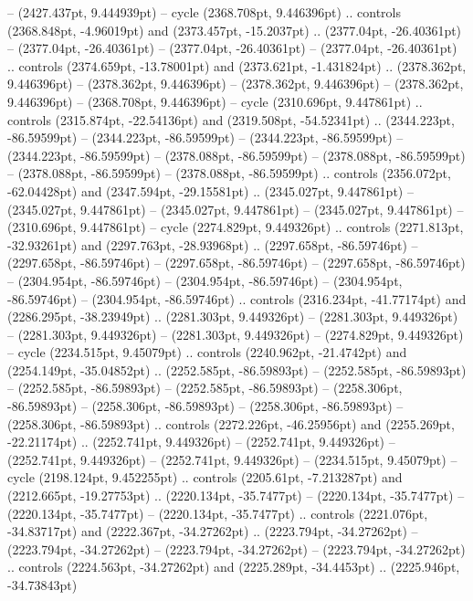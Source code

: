  -- (2427.437pt, 9.444939pt) -- cycle
(2368.708pt, 9.446396pt) .. controls (2368.848pt, -4.96019pt) and (2373.457pt, -15.2037pt) .. (2377.04pt, -26.40361pt)
 -- (2377.04pt, -26.40361pt)
 -- (2377.04pt, -26.40361pt)
 -- (2377.04pt, -26.40361pt) .. controls (2374.659pt, -13.78001pt) and (2373.621pt, -1.431824pt) .. (2378.362pt, 9.446396pt)
 -- (2378.362pt, 9.446396pt)
 -- (2378.362pt, 9.446396pt)
 -- (2378.362pt, 9.446396pt)
 -- (2368.708pt, 9.446396pt) -- cycle
(2310.696pt, 9.447861pt) .. controls (2315.874pt, -22.54136pt) and (2319.508pt, -54.52341pt) .. (2344.223pt, -86.59599pt)
 -- (2344.223pt, -86.59599pt)
 -- (2344.223pt, -86.59599pt)
 -- (2344.223pt, -86.59599pt)
 -- (2378.088pt, -86.59599pt)
 -- (2378.088pt, -86.59599pt)
 -- (2378.088pt, -86.59599pt)
 -- (2378.088pt, -86.59599pt) .. controls (2356.072pt, -62.04428pt) and (2347.594pt, -29.15581pt) .. (2345.027pt, 9.447861pt)
 -- (2345.027pt, 9.447861pt)
 -- (2345.027pt, 9.447861pt)
 -- (2345.027pt, 9.447861pt)
 -- (2310.696pt, 9.447861pt) -- cycle
(2274.829pt, 9.449326pt) .. controls (2271.813pt, -32.93261pt) and (2297.763pt, -28.93968pt) .. (2297.658pt, -86.59746pt)
 -- (2297.658pt, -86.59746pt)
 -- (2297.658pt, -86.59746pt)
 -- (2297.658pt, -86.59746pt)
 -- (2304.954pt, -86.59746pt)
 -- (2304.954pt, -86.59746pt)
 -- (2304.954pt, -86.59746pt)
 -- (2304.954pt, -86.59746pt) .. controls (2316.234pt, -41.77174pt) and (2286.295pt, -38.23949pt) .. (2281.303pt, 9.449326pt)
 -- (2281.303pt, 9.449326pt)
 -- (2281.303pt, 9.449326pt)
 -- (2281.303pt, 9.449326pt)
 -- (2274.829pt, 9.449326pt) -- cycle
(2234.515pt, 9.45079pt) .. controls (2240.962pt, -21.4742pt) and (2254.149pt, -35.04852pt) .. (2252.585pt, -86.59893pt)
 -- (2252.585pt, -86.59893pt)
 -- (2252.585pt, -86.59893pt)
 -- (2252.585pt, -86.59893pt)
 -- (2258.306pt, -86.59893pt)
 -- (2258.306pt, -86.59893pt)
 -- (2258.306pt, -86.59893pt)
 -- (2258.306pt, -86.59893pt) .. controls (2272.226pt, -46.25956pt) and (2255.269pt, -22.21174pt) .. (2252.741pt, 9.449326pt)
 -- (2252.741pt, 9.449326pt)
 -- (2252.741pt, 9.449326pt)
 -- (2252.741pt, 9.449326pt)
 -- (2234.515pt, 9.45079pt) -- cycle
(2198.124pt, 9.452255pt) .. controls (2205.61pt, -7.213287pt) and (2212.665pt, -19.27753pt) .. (2220.134pt, -35.7477pt)
 -- (2220.134pt, -35.7477pt)
 -- (2220.134pt, -35.7477pt)
 -- (2220.134pt, -35.7477pt) .. controls (2221.076pt, -34.83717pt) and (2222.367pt, -34.27262pt) .. (2223.794pt, -34.27262pt)
 -- (2223.794pt, -34.27262pt)
 -- (2223.794pt, -34.27262pt)
 -- (2223.794pt, -34.27262pt) .. controls (2224.563pt, -34.27262pt) and (2225.289pt, -34.4453pt) .. (2225.946pt, -34.73843pt)
